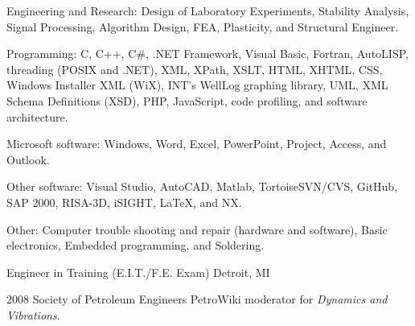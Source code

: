 \documentclass{resume}
\begin{document}
    \begin{bulletedlist}
		
        \item Engineering and Research: Design of Laboratory Experiments,
                        Stability Analysis,
                        Signal Processing,
                        Algorithm Design,
                        FEA,
                        Plasticity,
                        and Structural Engineer.
                        
        \item Programming: C,
                        C++,
                        C\#,
                        .NET Framework,
                        Visual Basic,
                        Fortran,
                        AutoLISP,
                        threading (POSIX and .NET),
                        XML,
                        XPath,
                        XSLT,
                        HTML,
                        XHTML,
                        CSS,
                        Windows Installer XML (WiX),
                        INT's WellLog graphing library,
                        UML,
                        XML Schema Definitions (XSD),
                        PHP,
                        JavaScript,
                        code profiling,
                        and software architecture.
                        
        \item Microsoft software: Windows,
                        Word,
                        Excel,
                        PowerPoint,
                        Project,
                        Access,
                        and Outlook.
                        
        \item Other software: Visual Studio,
                        AutoCAD,
                        Matlab,
                        TortoiseSVN/CVS,
                        GitHub,
                        SAP 2000,
                        RISA-3D,
                        iSIGHT,
                        LaTeX,
                        and NX.
                        
        \item Other: Computer trouble shooting and repair (hardware and software),
                        Basic electronics,
                        Embedded programming,
                        and Soldering.
                        
	\end{bulletedlist}
	

		
                {Engineer in Training (E.I.T./F.E. Exam)}
                {Detroit, MI}
        

		
                \catentrymembership
        {2008}
        {Society of Petroleum Engineers}
    {PetroWiki moderator for \emph{Dynamics and Vibrations}.}
            

        
\end{document}
